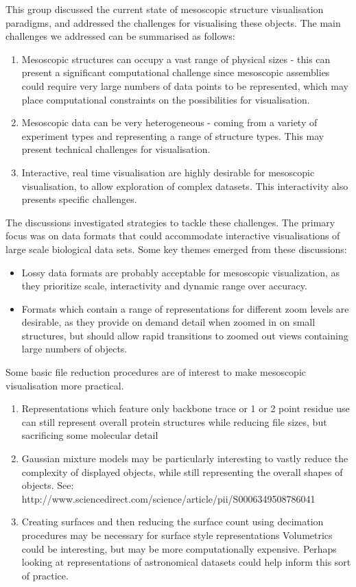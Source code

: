 \documentclass[a4paper]{article}
\begin{document}
This group discussed the current state of mesoscopic structure visualisation paradigms, and addressed the challenges for visualising these objects. The main challenges we addressed can be summarised as follows:
\begin{enumerate}
\item Mesoscopic structures can occupy a vast range of physical sizes - this can present a significant computational challenge since mesoscopic assemblies could require very large numbers of data points to be represented, which may place computational constraints on the possibilities for visualisation.
\item Mesoscopic data can be very heterogeneous - coming from a variety of experiment types and representing a range of structure types. This may present technical challenges for visualisation.
\item Interactive, real time visualisation are highly desirable for mesoscopic visualisation, to allow exploration of complex datasets. This interactivity also presents specific challenges.
\end{enumerate}

The discussions investigated strategies to tackle these challenges. The primary focus was on data formats that could accommodate interactive visualisations of large scale biological data sets. Some key themes emerged from these discussions:
\begin{itemize}
\item Lossy data formats are probably acceptable for mesoscopic visualization, as they prioritize scale, interactivity and dynamic range over accuracy.
\item Formats which contain a range of representations for different zoom levels are desirable, as they provide on demand detail when zoomed in on small structures, but should allow rapid transitions to zoomed out views containing large numbers of objects.
\end{itemize}

Some basic file reduction procedures are of interest to make mesoscopic visualisation more practical.
\begin{enumerate}
\item Representations which feature only backbone trace or 1 or 2 point residue use can still represent overall protein structures while reducing file sizes, but sacrificing some molecular detail
\item Gaussian mixture models may be particularly interesting to vastly reduce the complexity of displayed objects, while still representing the overall shapes of objects. See: http://www.sciencedirect.com/science/article/pii/S0006349508786041
\item Creating surfaces and then reducing the surface count using decimation procedures may be necessary for surface style representations
Volumetrics could be interesting, but may be more computationally expensive. Perhaps looking at representations of astronomical datasets could help inform this sort of practice.
\end{enumerate}
\end{document}

